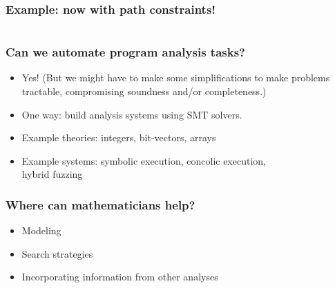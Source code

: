 \documentclass[11pt,table]{beamer}
\begin{document}
\begin{frame}
  \frametitle{Example: now with path constraints!}
  \begin{columns}
\end{columns}
  
\end{frame}

 \begin{frame}
\frametitle{Can we automate program analysis tasks?}
\begin{itemize}
\item{Yes! (But we might have to make some simplifications to make problems tractable, compromising soundness and/or completeness.)}
  \medskip
  \item{One way: build analysis systems using SMT solvers.}
    \medskip
  \item{Example theories: integers, bit-vectors, arrays}
    \medskip
    \item{Example systems: symbolic execution, concolic execution, \\hybrid fuzzing}
      \end{itemize}
  \end{frame}

  

\begin{frame}
\frametitle{Where can mathematicians help?}
\begin{itemize}
\item{Modeling}
  \medskip
\item{Search strategies}
  \medskip
\item{Incorporating information from other analyses}
  \end{itemize}
\end{frame}
\end{document}
